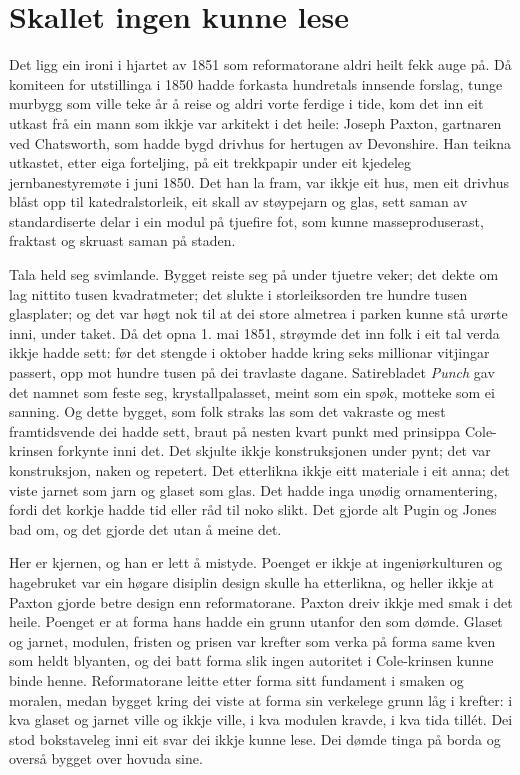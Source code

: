 \section{Skallet ingen kunne lese}

Det ligg ein ironi i hjartet av 1851 som reformatorane aldri heilt fekk auge på. Då komiteen for utstillinga i 1850 hadde forkasta hundretals innsende forslag, tunge murbygg som ville teke år å reise og aldri vorte ferdige i tide, kom det inn eit utkast frå ein mann som ikkje var arkitekt i det heile: Joseph Paxton, gartnaren ved Chatsworth, som hadde bygd drivhus for hertugen av Devonshire. Han teikna utkastet, etter eiga forteljing, på eit trekkpapir under eit kjedeleg jernbanestyremøte i juni 1850. Det han la fram, var ikkje eit hus, men eit drivhus blåst opp til katedralstorleik, eit skall av støypejarn og glas, sett saman av standardiserte delar i ein modul på tjuefire fot, som kunne masseproduserast, fraktast og skruast saman på staden.

Tala held seg svimlande. Bygget reiste seg på under tjuetre veker; det dekte om lag nittito tusen kvadratmeter; det slukte i storleiksorden tre hundre tusen glasplater; og det var høgt nok til at dei store almetrea i parken kunne stå urørte inni, under taket. Då det opna 1. mai 1851, strøymde det inn folk i eit tal verda ikkje hadde sett: før det stengde i oktober hadde kring seks millionar vitjingar passert, opp mot hundre tusen på dei travlaste dagane. Satirebladet \textit{Punch} gav det namnet som feste seg, krystallpalasset, meint som ein spøk, motteke som ei sanning. Og dette bygget, som folk straks las som det vakraste og mest framtidsvende dei hadde sett, braut på nesten kvart punkt med prinsippa Cole-krinsen forkynte inni det. Det skjulte ikkje konstruksjonen under pynt; det var konstruksjon, naken og repetert. Det etterlikna ikkje eitt materiale i eit anna; det viste jarnet som jarn og glaset som glas. Det hadde inga unødig ornamentering, fordi det korkje hadde tid eller råd til noko slikt. Det gjorde alt Pugin og Jones bad om, og det gjorde det utan å meine det.

Her er kjernen, og han er lett å mistyde. Poenget er ikkje at ingeniørkulturen og hagebruket var ein høgare disiplin design skulle ha etterlikna, og heller ikkje at Paxton gjorde betre design enn reformatorane. Paxton dreiv ikkje med smak i det heile. Poenget er at forma hans hadde ein grunn utanfor den som dømde. Glaset og jarnet, modulen, fristen og prisen var krefter som verka på forma same kven som heldt blyanten, og dei batt forma slik ingen autoritet i Cole-krinsen kunne binde henne. Reformatorane leitte etter forma sitt fundament i smaken og moralen, medan bygget kring dei viste at forma sin verkelege grunn låg i krefter: i kva glaset og jarnet ville og ikkje ville, i kva modulen kravde, i kva tida tillét. Dei stod bokstaveleg inni eit svar dei ikkje kunne lese. Dei dømde tinga på borda og overså bygget over hovuda sine.

